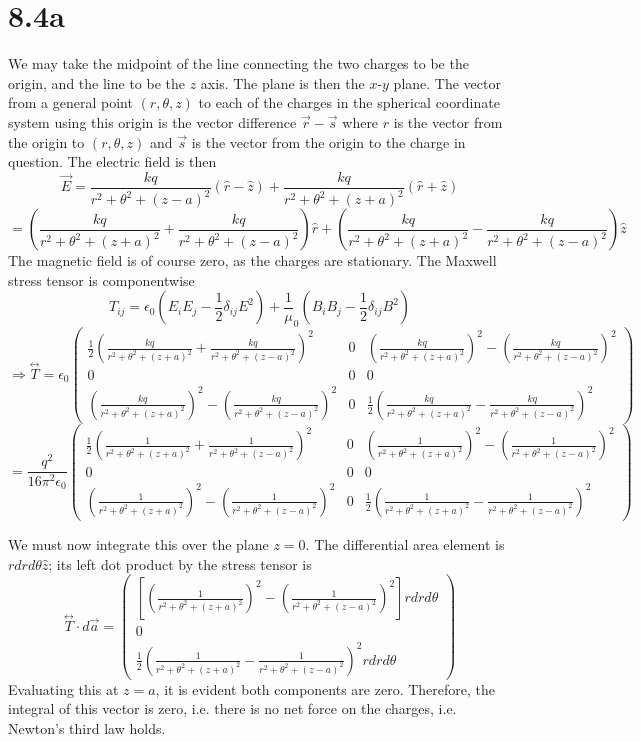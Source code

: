 \documentclass{article}
\begin{document}
\section*{8.4a}
We may take the midpoint of the line connecting the two charges to be the origin, and the line to be the $z$ axis. The plane is then the $x$-$y$ plane. The vector from a general point $(r,\theta, z)$ to each of the charges in the spherical coordinate system using this origin is the vector difference $\vec{r}-\vec{s}$ where $r$ is the vector from the origin to $(r,\theta,z)$ and $\vec{s}$ is the vector from the origin to the charge in question. The electric field is then
\[\vec{E}=\frac{kq}{r^2+\theta^2+(z-a)^2}(\hat{r}-\hat{z})+\frac{kq}{r^2+\theta^2+(z+a)^2}(\hat{r}+\hat{z})\]
\[=\left( \frac{kq}{r^2+\theta^2+(z+a)^2}+\frac{kq}{r^2+\theta^2+(z-a)^2}\right)\hat{r}+\left( \frac{kq}{r^2+\theta^2+(z+a)^2}-\frac{kq}{r^2+\theta^2+(z-a)^2}\right)\hat{z}\]
The magnetic field is of course zero, as the charges are stationary. The Maxwell stress tensor is componentwise
\[T_{ij}=\epsilon_0\left( E_iE_j-\frac{1}{2}\delta_{ij}E^2\right)+\frac{1}\mu_0\left( B_iB_j-\frac{1}{2}\delta_{ij}B^2 \right)\]
\[\Rightarrow \overset{\leftrightarrow}{T}=
  \epsilon_0\begin{pmatrix}
    \frac{1}{2}\left( \frac{kq}{r^2+\theta^2+(z+a)^2}+\frac{kq}{r^2+\theta^2+(z-a)^2}\right)^2 & 0 & \left( \frac{kq}{r^2+\theta^2+(z+a)^2}\right)^2-\left( \frac{kq}{r^2+\theta^2+(z-a)^2}\right)^2 \\
    0 & 0 & 0 \\
    \left( \frac{kq}{r^2+\theta^2+(z+a)^2}\right)^2-\left( \frac{kq}{r^2+\theta^2+(z-a)^2}\right)^2  & 0 & \frac{1}{2}\left( \frac{kq}{r^2+\theta^2+(z+a)^2}-\frac{kq}{r^2+\theta^2+(z-a)^2}\right)^2
  \end{pmatrix}
\]
\[=\frac{q^2}{16\pi^2\epsilon_0}\begin{pmatrix}
    \frac{1}{2}\left( \frac{1}{r^2+\theta^2+(z+a)^2}+\frac{1}{r^2+\theta^2+(z-a)^2}\right)^2 & 0 & \left( \frac{1}{r^2+\theta^2+(z+a)^2}\right)^2-\left( \frac{1}{r^2+\theta^2+(z-a)^2}\right)^2 \\
    0 & 0 & 0 \\
    \left( \frac{1}{r^2+\theta^2+(z+a)^2}\right)^2-\left( \frac{1}{r^2+\theta^2+(z-a)^2}\right)^2  & 0 & \frac{1}{2}\left( \frac{1}{r^2+\theta^2+(z+a)^2}-\frac{1}{r^2+\theta^2+(z-a)^2}\right)^2
  \end{pmatrix}\]

We must now integrate this over the plane $z=0$. The differential area element is $rdrd\theta\hat{z}$; its left dot product by the stress tensor is
\[\overset{\leftrightarrow}{T}\cdot d\vec{a}=
  \begin{pmatrix}
    \left[ \left( \frac{1}{r^2+\theta^2+(z+a)^2}\right)^2-\left( \frac{1}{r^2+\theta^2+(z-a)^2}\right)^2\right]rdrd\theta \\
    0 \\
    \frac{1}{2}\left( \frac{1}{r^2+\theta^2+(z+a)^2}-\frac{1}{r^2+\theta^2+(z-a)^2}\right)^2rdrd\theta
  \end{pmatrix}
\]
Evaluating this at $z=a$, it is evident both components are zero. Therefore, the integral of this vector is zero, i.e. there is no net force on the charges, i.e. Newton's third law holds.
\end{document}
